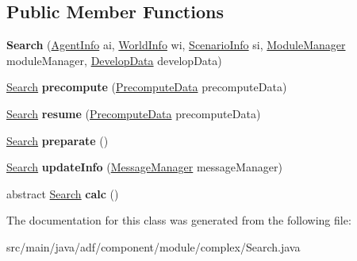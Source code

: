 \subsection*{Public Member Functions}
\begin{DoxyCompactItemize}
\item 
\hypertarget{classadf_1_1component_1_1module_1_1complex_1_1Search_aa7f299fbbc683d487a38d7a9594463ab}{}\label{classadf_1_1component_1_1module_1_1complex_1_1Search_aa7f299fbbc683d487a38d7a9594463ab} 
{\bfseries Search} (\hyperlink{classadf_1_1agent_1_1info_1_1AgentInfo}{Agent\+Info} ai, \hyperlink{classadf_1_1agent_1_1info_1_1WorldInfo}{World\+Info} wi, \hyperlink{classadf_1_1agent_1_1info_1_1ScenarioInfo}{Scenario\+Info} si, \hyperlink{classadf_1_1agent_1_1module_1_1ModuleManager}{Module\+Manager} module\+Manager, \hyperlink{classadf_1_1agent_1_1develop_1_1DevelopData}{Develop\+Data} develop\+Data)
\item 
\hypertarget{classadf_1_1component_1_1module_1_1complex_1_1Search_a086ffb5b1d3930b32fac7680f1fea079}{}\label{classadf_1_1component_1_1module_1_1complex_1_1Search_a086ffb5b1d3930b32fac7680f1fea079} 
\hyperlink{classadf_1_1component_1_1module_1_1complex_1_1Search}{Search} {\bfseries precompute} (\hyperlink{classadf_1_1agent_1_1precompute_1_1PrecomputeData}{Precompute\+Data} precompute\+Data)
\item 
\hypertarget{classadf_1_1component_1_1module_1_1complex_1_1Search_a2d8c53328d34ae20581086900f96c8d6}{}\label{classadf_1_1component_1_1module_1_1complex_1_1Search_a2d8c53328d34ae20581086900f96c8d6} 
\hyperlink{classadf_1_1component_1_1module_1_1complex_1_1Search}{Search} {\bfseries resume} (\hyperlink{classadf_1_1agent_1_1precompute_1_1PrecomputeData}{Precompute\+Data} precompute\+Data)
\item 
\hypertarget{classadf_1_1component_1_1module_1_1complex_1_1Search_a2891cce13e95cec1868b290fbcca56d7}{}\label{classadf_1_1component_1_1module_1_1complex_1_1Search_a2891cce13e95cec1868b290fbcca56d7} 
\hyperlink{classadf_1_1component_1_1module_1_1complex_1_1Search}{Search} {\bfseries preparate} ()
\item 
\hypertarget{classadf_1_1component_1_1module_1_1complex_1_1Search_a5f31bb45c4b601bddfcccbb5e0b0c591}{}\label{classadf_1_1component_1_1module_1_1complex_1_1Search_a5f31bb45c4b601bddfcccbb5e0b0c591} 
\hyperlink{classadf_1_1component_1_1module_1_1complex_1_1Search}{Search} {\bfseries update\+Info} (\hyperlink{classadf_1_1agent_1_1communication_1_1MessageManager}{Message\+Manager} message\+Manager)
\item 
\hypertarget{classadf_1_1component_1_1module_1_1complex_1_1Search_ad6a3750f5501ffe8d69dcd361edebad0}{}\label{classadf_1_1component_1_1module_1_1complex_1_1Search_ad6a3750f5501ffe8d69dcd361edebad0} 
abstract \hyperlink{classadf_1_1component_1_1module_1_1complex_1_1Search}{Search} {\bfseries calc} ()
\end{DoxyCompactItemize}


The documentation for this class was generated from the following file\+:\begin{DoxyCompactItemize}
\item 
src/main/java/adf/component/module/complex/Search.\+java\end{DoxyCompactItemize}
